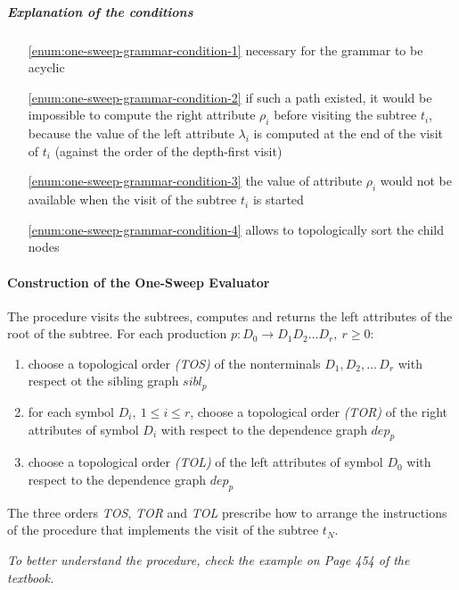 \documentclass[english]{article}
\begin{document}
\subparagraph*{Explanation of the conditions}

\begin{enumerate}[labelindent=15pt, leftmargin=*, widest=(A)]
  \item[\ref{enum:one-sweep-grammar-condition-1}] necessary for the grammar to be acyclic
  \item[\ref{enum:one-sweep-grammar-condition-2}] if such a path existed, it would be impossible to compute the right attribute \(\rho_i\) before visiting the subtree \(t_i\), because the value of the left attribute \(\lambda_i\) is computed at the end of the visit of \(t_i\) (against the order of the depth-first visit)
  \item[\ref{enum:one-sweep-grammar-condition-3}] the value of attribute \(\rho_i\) would not be available when the visit of the subtree \(t_i\) is started
  \item[\ref{enum:one-sweep-grammar-condition-4}] allows to topologically sort the child nodes
\end{enumerate}

\paragraph{Construction of the One-Sweep Evaluator}

The procedure visits the subtrees, computes and returns the left attributes of the root of the subtree.
For each production \(p : D_0 \rightarrow D_1 D_2 \ldots D_r, \ r \geq 0\):

\begin{enumerate}
  \item choose a topological order \textit{(TOS)} of the nonterminals \(D_1, D_2, \ldots \, D_r\) with respect ot the sibling graph \(\textit{sibl}_p\)
  \item for each symbol \(D_i, \ 1 \leq i \leq r\), choose a topological order \textit{(TOR)} of the right attributes of symbol \(D_i\) with respect to the dependence graph \(\textit{dep}_p\)
  \item choose a topological order \textit{(TOL)} of the left attributes of symbol \(D_0\) with respect to the dependence graph \(\textit{dep}_p\)
\end{enumerate}

The three orders \textit{TOS}, \textit{TOR} and \textit{TOL} prescribe how to arrange the instructions of the procedure that implements the visit of the subtree \(t_N\).

\bigskip
\textit{To better understand the procedure, check the example on Page 454 of the textbook.}
\end{document}
